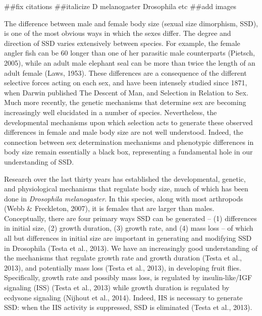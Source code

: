 \documentclass[
  11pt,
]{article}
\author{}
\date{\vspace{-2.5em}}
\begin{document}
\#\#fix citations \#\#italicize D melanogaster Drosophila etc \#\#add
images

\raggedright

\setlength{\parindent}{24pt}

The difference between male and female body size (sexual size
dimorphism, SSD), is one of the most obvious ways in which the sexes
differ. The degree and direction of SSD varies extensively between
species. For example, the female angler fish can be 60 longer than one
of her parasitic male counterparts \citep{Test2024} (Pietsch, 2005),
while an adult male elephant seal can be more than twice the length of
an adult female (Laws, 1953). These differences are a consequence of the
different selective forces acting on each sex, and have been intensely
studied since 1871, when Darwin published The Descent of Man, and
Selection in Relation to Sex. Much more recently, the genetic mechanisms
that determine sex are becoming increasingly well elucidated in a number
of species. Nevertheless, the developmental mechanisms upon which
selection acts to generate these observed differences in female and male
body size are not well understood. Indeed, the connection between sex
determination mechanisms and phenotypic differences in body size remain
essentially a black box, representing a fundamental hole in our
understanding of SSD.

Research over the last thirty years has established the developmental,
genetic, and physiological mechanisms that regulate body size, much of
which has been done in \textit{Drosophila melanogaster}. In this
species, along with most arthropods (Webb \& Freckleton, 2007), it is
females that are larger than males. Conceptually, there are four primary
ways SSD can be generated -- (1) differences in initial size, (2) growth
duration, (3) growth rate, and (4) mass loss -- of which all but
differences in initial size are important in generating and modifying
SSD in Drosophila (Testa et al., 2013). We have an increasingly good
understanding of the mechanisms that regulate growth rate and growth
duration (Testa et al., 2013), and potentially mass loss (Testa et al.,
2013), in developing fruit flies. Specifically, growth rate and possibly
mass loss, is regulated by insulin-like/IGF signaling (ISS) (Testa et
al., 2013) while growth duration is regulated by ecdysone signaling
(Nijhout et al., 2014). Indeed, IIS is necessary to generate SSD: when
the IIS activity is suppressed, SSD is eliminated (Testa et al., 2013).
\end{document}
